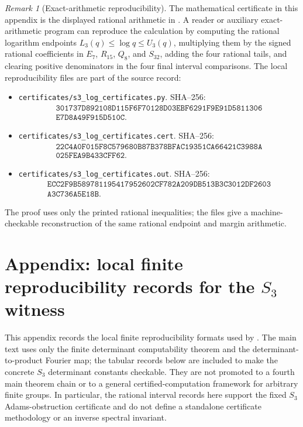 \documentclass[11pt,a4paper]{amsart}
\theoremstyle{plain}
\theoremstyle{definition}
\theoremstyle{remark}
\newtheorem{remark}[theorem]{Remark}
\begin{document}
\begin{remark}[Exact-arithmetic reproducibility]
  The mathematical certificate in this appendix is the displayed rational
  arithmetic in
  .
  A reader or auxiliary exact-arithmetic program can reproduce the calculation
  by computing the rational logarithm endpoints
  \(L_3(q)\le\log q\le U_3(q)\), multiplying them by the signed rational
  coefficients in \(E_7\), \(R_{15}\), \(Q_8\), and \(S_{32}\), adding the four
  rational tails, and clearing positive denominators in the four final interval
  comparisons.  The local reproducibility files are part of the source record:
  \begin{itemize}[leftmargin=*]
  \item \texttt{certificates/s3\_log\_certificates.py}. SHA--256:
    \[\begin{array}{l}
      \texttt{301737D892108D115F6F70128D03EBF6291F9E91D5811306}\\
      \texttt{E7D8A49F915D510C}.
    \end{array}\]
  \item \texttt{certificates/s3\_log\_certificates.cert}. SHA--256:
    \[\begin{array}{l}
      \texttt{22C4A0F015F8C579680B87B378BFAC19351CA66421C3988A}\\
      \texttt{025FEA9B433CFF62}.
    \end{array}\]
  \item \texttt{certificates/s3\_log\_certificates.out}. SHA--256:
    \[\begin{array}{l}
      \texttt{ECC2F9B589781195417952602CF782A209DB513B3C3012DF2603}\\
      \texttt{A3C736A5E18B}.
    \end{array}\]
  \end{itemize}
  The proof uses only the printed rational inequalities; the files give a
  machine-checkable reconstruction of the same rational endpoint and margin
  arithmetic.
\end{remark}
\section{Appendix: local finite reproducibility records for the \texorpdfstring{\(S_3\)}{S3} witness}
\label{app:fixed-label-local-certificates}

This appendix records the local finite reproducibility formats used by
.  The main text uses only
the finite determinant computability theorem and the determinant-to-product
Fourier map; the tabular records below are included to make the concrete
\(S_3\) determinant constants checkable.  They are not promoted to a fourth
main theorem chain or to a general certified-computation framework for
arbitrary finite groups.  In particular, the rational interval records here
support the fixed \(S_3\) Adams-obstruction certificate and do not define a
standalone certificate methodology or an inverse spectral invariant.
\end{document}
